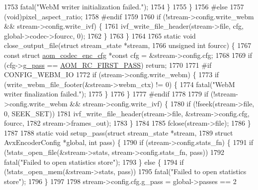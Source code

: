 \begin{DoxyCodeInclude}
{{{{{{{{{{{{{{{{{{{{{{{{{{{{{{{1753       fatal(\textcolor{stringliteral}{"WebM writer initialization failed."});
1754     \}
1755   \}
1756 \textcolor{preprocessor}{#else}
1757   (void)pixel\_aspect\_ratio;
1758 \textcolor{preprocessor}{#endif}
1759 
1760   \textcolor{keywordflow}{if} (!stream->config.write\_webm && stream->config.write\_ivf) \{
1761     ivf\_write\_file\_header(stream->file, cfg, global->codec->fourcc, 0);
1762   \}
1763 \}
1764 
1765 \textcolor{keyword}{static} \textcolor{keywordtype}{void} close\_output\_file(\textcolor{keyword}{struct} stream\_state *stream,
1766                               \textcolor{keywordtype}{unsigned} \textcolor{keywordtype}{int} fourcc) \{
1767   \textcolor{keyword}{const} \textcolor{keyword}{struct }\hyperlink{structaom__codec__enc__cfg}{aom\_codec\_enc\_cfg} *\textcolor{keyword}{const} cfg = &stream->config.cfg;
1768 
1769   \textcolor{keywordflow}{if} (cfg->\hyperlink{structaom__codec__enc__cfg_aad58e4d10c7904d50ce959aef202dc64}{g\_pass} == \hyperlink{group__encoder_gga92b6709b58dc3435e3ba652da562eda1ad342b33a290482c20238bfde5d9bea1e}{AOM\_RC\_FIRST\_PASS}) \textcolor{keywordflow}{return};
1770 
1771 \textcolor{preprocessor}{#if CONFIG\_WEBM\_IO}
1772   \textcolor{keywordflow}{if} (stream->config.write\_webm) \{
1773     \textcolor{keywordflow}{if} (write\_webm\_file\_footer(&stream->webm\_ctx) != 0) \{
1774       fatal(\textcolor{stringliteral}{"WebM writer finalization failed."});
1775     \}
1776   \}
1777 \textcolor{preprocessor}{#endif}
1778 
1779   \textcolor{keywordflow}{if} (!stream->config.write\_webm && stream->config.write\_ivf) \{
1780     \textcolor{keywordflow}{if} (!fseek(stream->file, 0, SEEK\_SET))
1781       ivf\_write\_file\_header(stream->file, &stream->config.cfg, fourcc,
1782                             stream->frames\_out);
1783   \}
1784 
1785   fclose(stream->file);
1786 \}
1787 
1788 \textcolor{keyword}{static} \textcolor{keywordtype}{void} setup\_pass(\textcolor{keyword}{struct} stream\_state *stream,
1789                        \textcolor{keyword}{struct} AvxEncoderConfig *global, \textcolor{keywordtype}{int} pass) \{
1790   \textcolor{keywordflow}{if} (stream->config.stats\_fn) \{
1791     \textcolor{keywordflow}{if} (!stats\_open\_file(&stream->stats, stream->config.stats\_fn, pass))
1792       fatal(\textcolor{stringliteral}{"Failed to open statistics store"});
1793   \} \textcolor{keywordflow}{else} \{
1794     \textcolor{keywordflow}{if} (!stats\_open\_mem(&stream->stats, pass))
1795       fatal(\textcolor{stringliteral}{"Failed to open statistics store"});
1796   \}
1797 
1798   stream->config.cfg.g\_pass = global->passes == 2
}}}}}}}}}}}}}}}}}}}}}}}}}}}}}}}
\end{DoxyCodeInclude}
